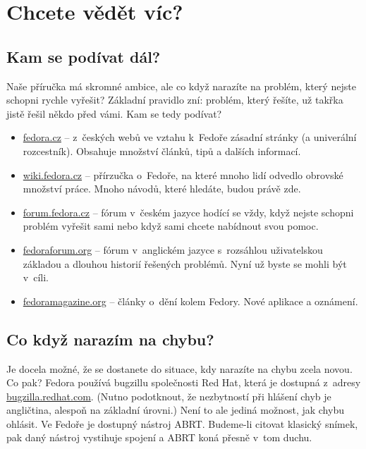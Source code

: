 \chapter*{Chcete vědět víc?}

\section*{Kam se podívat dál?}
Naše příručka má skromné ambice, ale co když narazíte na problém, který nejste schopni rychle vyřešit? Základní pravidlo zní: problém, který řešíte, už takřka jistě řešil někdo před vámi. Kam se tedy podívat?

\begin{itemize}
\item \url{fedora.cz} -- z~českých webů ve vztahu k~Fedoře zásadní stránky (a univerální rozcestník). Obsahuje množství článků, tipů a dalších informací.
\item \url{wiki.fedora.cz} -- přírzučka o~Fedoře, na které mnoho lidí odvedlo obrovské množství práce. Mnoho návodů, které hledáte, budou právě zde.
\item \url{forum.fedora.cz} -- fórum v~českém jazyce hodící se vždy, když nejste schopni problém vyřešit sami nebo když sami chcete nabídnout svou pomoc.
\item \url{fedoraforum.org} -- fórum v~anglickém jazyce s~rozsáhlou uživatelskou základou a dlouhou historií řešených problémů. Nyní už byste se mohli být v~cíli.
\item \url{fedoramagazine.org} -- články o~dění kolem Fedory. Nové aplikace a oznámení.
\end{itemize}

\section*{Co když narazím na chybu?}
Je docela možné, že se dostanete do situace, kdy narazíte na chybu zcela novou. Co pak? Fedora používá bugzillu společnosti Red Hat, která je dostupná z~adresy \url{bugzilla.redhat.com}. (Nutno podotknout, že nezbytností při hlášení chyb je angličtina, alespoň na základní úrovni.) Není to ale jediná možnost, jak chybu ohlásit. Ve Fedoře je dostupný nástroj ABRT. Budeme-li citovat klasický snímek, pak daný nástroj vystihuje spojení \emph{} a ABRT koná přesně v~tom duchu.

